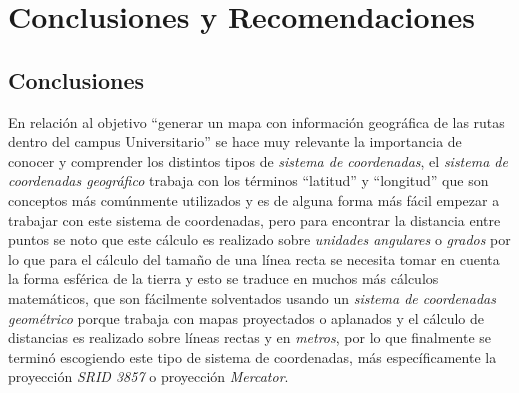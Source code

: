 
\chapter{Conclusiones y Recomendaciones}

\section{Conclusiones}


En relación al objetivo ``generar un mapa con información geográfica de las rutas dentro del campus Universitario'' se hace muy relevante la importancia de conocer y comprender los distintos tipos de \emph{sistema de coordenadas}, el \emph{sistema de coordenadas geográfico} trabaja con los términos ``latitud'' y ``longitud'' que son conceptos más comúnmente utilizados y es de alguna forma más fácil empezar a trabajar con este sistema de coordenadas, pero para encontrar la distancia entre puntos se noto que este cálculo es realizado sobre \emph{unidades angulares} o \emph{grados} por lo que para el cálculo del tamaño de una línea recta se necesita tomar en cuenta la forma esférica de la tierra y esto se traduce en muchos más cálculos matemáticos, que son fácilmente solventados usando un \emph{sistema de coordenadas geométrico} porque trabaja con mapas proyectados o aplanados y el cálculo de distancias es realizado sobre líneas rectas y en \emph{metros}, por lo que finalmente se terminó escogiendo este tipo de sistema de coordenadas, más específicamente la proyección \emph{SRID 3857} o proyección \emph{Mercator}. \\





